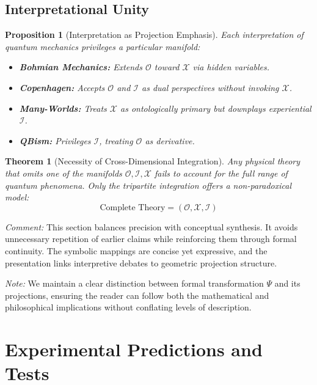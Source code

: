 \documentclass{article}
\newtheorem{theorem}{Theorem}
\newtheorem{proposition}{Proposition}
\begin{document}
\subsection{Interpretational Unity}

\begin{proposition}[Interpretation as Projection Emphasis]
Each interpretation of quantum mechanics privileges a particular manifold:
\begin{itemize}
    \item \textbf{Bohmian Mechanics:} Extends $\mathcal{O}$ toward $\mathcal{X}$ via hidden variables.
    \item \textbf{Copenhagen:} Accepts $\mathcal{O}$ and $\mathcal{I}$ as dual perspectives without invoking $\mathcal{X}$.
    \item \textbf{Many-Worlds:} Treats $\mathcal{X}$ as ontologically primary but downplays experiential $\mathcal{I}$.
    \item \textbf{QBism:} Privileges $\mathcal{I}$, treating $\mathcal{O}$ as derivative.
\end{itemize}
\end{proposition}

\begin{theorem}[Necessity of Cross-Dimensional Integration]
Any physical theory that omits one of the manifolds $\mathcal{O}, \mathcal{I}, \mathcal{X}$ fails to account for the full range of quantum phenomena. Only the tripartite integration offers a non-paradoxical model:
\begin{equation}
\text{Complete Theory} = (\mathcal{O}, \mathcal{X}, \mathcal{I})
\end{equation}
\end{theorem}

\textit{Comment:} This section balances precision with conceptual synthesis. It avoids unnecessary repetition of earlier claims while reinforcing them through formal continuity. The symbolic mappings are concise yet expressive, and the presentation links interpretive debates to geometric projection structure.

\textit{Note:} We maintain a clear distinction between formal transformation $\Psi$ and its projections, ensuring the reader can follow both the mathematical and philosophical implications without conflating levels of description.




\section{Experimental Predictions and Tests}
\end{document}
